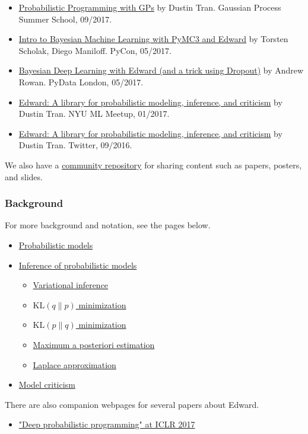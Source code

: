 \begin{itemize}
  \item
  \href{https://www.youtube.com/watch?list=PLpTp0l_CVmgwyAthrUmmdIFiunV1VvicM&v=1zNNLHyeWok}
  {Probabilistic Programming with GPs}
  by Dustin Tran. Gaussian Process Summer School, 09/2017.
  \item
  \href{https://youtu.be/fR5Wvb86-IU}
  {Intro to Bayesian Machine Learning with PyMC3 and Edward}
  by Torsten Scholak, Diego Maniloff. PyCon, 05/2017.
  \item
  \href{https://www.youtube.com/watch?v=I09QVNrUS3Q}
  {Bayesian Deep Learning with Edward (and a trick using Dropout)}
  by Andrew Rowan. PyData London, 05/2017.
  \item
  \href{http://bit.ly/2k9QM3J}
  {Edward: A library for probabilistic modeling, inference, and
  criticism}
  by Dustin Tran. NYU ML Meetup, 01/2017.
  \item
  \href{https://www.pscp.tv/hugo_larochelle/1yNGanvpOPjJj}
  {Edward: A library for probabilistic modeling, inference, and criticism}
  by Dustin Tran. Twitter, 09/2016.
\end{itemize}

We also have a
\href{https://github.com/edwardlib/papers}{community repository}
for sharing content such as papers, posters, and slides.

\subsubsection{Background}

For more background and notation, see the pages below.
\begin{itemize}
  \item \href{model}{Probabilistic models}
  \item \href{inference}{Inference of probabilistic models}
  \begin{itemize}
   \item \href{variational-inference}{Variational inference}
   \item \href{klqp}{$\text{KL}(q\|p)$ minimization}
   \item \href{klpq}{$\text{KL}(p\|q)$ minimization}
   \item \href{map}{Maximum a posteriori estimation}
   \item \href{map-laplace}{Laplace approximation}
  \end{itemize}
  \item \href{criticism}{Model criticism}
\end{itemize}

There are also companion webpages for several papers about Edward.
\begin{itemize}
  \item \href{/iclr2017}{"Deep probabilistic programming" at ICLR 2017}
\end{itemize}
